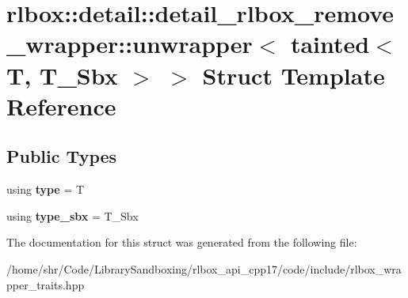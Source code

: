 \hypertarget{structrlbox_1_1detail_1_1detail__rlbox__remove__wrapper_1_1unwrapper_3_01tainted_3_01T_00_01T__Sbx_01_4_01_4}{}\section{rlbox\+:\+:detail\+:\+:detail\+\_\+rlbox\+\_\+remove\+\_\+wrapper\+:\+:unwrapper$<$ tainted$<$ T, T\+\_\+\+Sbx $>$ $>$ Struct Template Reference}
\label{structrlbox_1_1detail_1_1detail__rlbox__remove__wrapper_1_1unwrapper_3_01tainted_3_01T_00_01T__Sbx_01_4_01_4}
\subsection*{Public Types}
\begin{DoxyCompactItemize}
\item 
\mbox{\label{structrlbox_1_1detail_1_1detail__rlbox__remove__wrapper_1_1unwrapper_3_01tainted_3_01T_00_01T__Sbx_01_4_01_4_ace6e380e9e64a1681492c3a4f93f3cf5}} 
using {\bfseries type} = T
\item 
\mbox{\label{structrlbox_1_1detail_1_1detail__rlbox__remove__wrapper_1_1unwrapper_3_01tainted_3_01T_00_01T__Sbx_01_4_01_4_ac91e2c99e60e54c181ccce11433741ec}} 
using {\bfseries type\+\_\+sbx} = T\+\_\+\+Sbx
\end{DoxyCompactItemize}


The documentation for this struct was generated from the following file\+:\begin{DoxyCompactItemize}
\item 
/home/shr/\+Code/\+Library\+Sandboxing/rlbox\+\_\+api\+\_\+cpp17/code/include/rlbox\+\_\+wrapper\+\_\+traits.\+hpp\end{DoxyCompactItemize}
